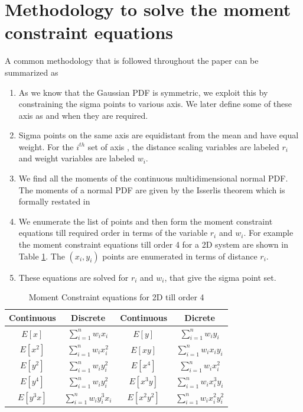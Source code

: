 \documentclass[letterpaper, 10 pt, conference]{ieeeconf}  %
\begin{document}
\section{Methodology to solve the moment constraint equations}
A common methodology that is followed throughout the paper can be summarized as
\begin{enumerate}
\item As we know that the Gaussian PDF is symmetric, we exploit this by constraining the sigma points to various axis.  We later define some of these axis as and when they are required.
\item Sigma points on the same axis  are equidistant from the mean and have equal weight. For the $i^{th}$  set of axis , the distance scaling variables are labeled $r_i$ and weight variables are labeled $w_i$.
\item We find all the moments of the continuous multidimensional normal PDF. The moments of a normal PDF are given by the Isserlis theorem which is formally restated in \cite{c7} 
\item We enumerate the list of points and then form the moment constraint equations till required order in terms of the variable $r_i$ and $w_i$. For example the moment constraint equations till order 4 for a 2D system are shown in Table \ref{moment_match}. The $(x_i,y_i)$ points are enumerated in terms of distance $r_i$. 
\item These equations are solved for $r_i$ and $w_i$, that give the sigma point set.
\end{enumerate}
\begin{table}
\caption{Moment Constraint equations for 2D till order 4}
\label{moment_match}
\begin{center}
\begin{tabular}{|c|c||c|c|}
\hline
Continuous & Discrete & Continuous & Dicrete\\
\hline
$E[x]$ & $\sum_{i=1}^n{w_ix_i}$& $E[y]$ & $\sum_{i=1}^n{w_iy_i}$\\
\hline
$E[x^2]$ & $\sum_{i=1}^n{w_ix_i^2}$& $E[xy]$ & $\sum_{i=1}^n{w_ix_iy_i}$\\
\hline
$E[y^2]$ & $\sum_{i=1}^n{w_iy_i^2}$& $E[x^4]$ & $\sum_{i=1}^n{w_ix_i^2}$ \\
\hline
$E[y^4]$ & $\sum_{i=1}^n{w_iy_i^2}$& $E[x^3y]$ & $\sum_{i=1}^n{w_ix_i^3y_i}$\\
\hline
$E[y^3x]$ & $\sum_{i=1}^n{w_iy_i^3x_i}$ & $E[x^2y^2]$ & $\sum_{i=1}^n{w_ix_i^2y_i^2}$\\
\hline
\end{tabular}
\end{center}
\end{table}
\end{document}
